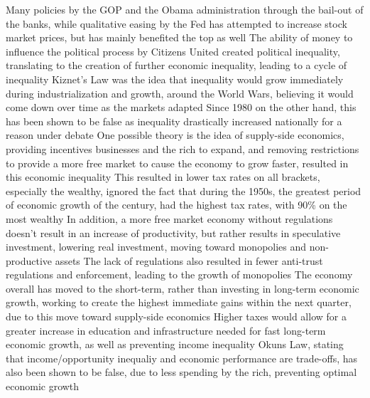 \documentclass[11 pt, twoside]{article}
\newenvironment{outline*}
{
	\begin{outline}[enumerate]
	}
	{\end{outline}
}
\begin{document}
\begin{outline*}
\2 Many policies by the GOP and the Obama administration through the bail-out of the banks, while qualitative easing by the Fed has attempted to increase stock market prices, but has mainly benefited the top as well
\2 The ability of money to influence the political process by Citizens United created political inequality, translating to the creation of further economic inequality, leading to a cycle of inequality
\1 Kiznet's Law was the idea that inequality would grow immediately during industrialization and growth, around the World Wars, believing it would come down over time as the markets adapted
\2 Since 1980 on the other hand, this has been shown to be false as inequality drastically increased nationally for a reason under debate
\2 One possible theory is the idea of supply-side economics, providing incentives businesses and the rich to expand, and removing restrictions to provide a more free market to cause the economy to grow faster, resulted in this economic inequality
\2 This resulted in lower tax rates on all brackets, especially the wealthy, ignored the fact that during the 1950s, the greatest period of economic growth of the century, had the highest tax rates, with 90\% on the most wealthy
\2 In addition, a more free market economy without regulations doesn't result in an increase of productivity, but rather results in speculative investment, lowering real investment, moving toward monopolies and non-productive assets
\2 The lack of regulations also resulted in fewer anti-trust regulations and enforcement, leading to the growth of monopolies
\1 The economy overall has moved to the short-term, rather than investing in long-term economic growth, working to create the highest immediate gains within the next quarter, due to this move toward supply-side economics
\2 Higher taxes would allow for a greater increase in education and infrastructure needed for fast long-term economic growth, as well as preventing income inequality
\1 Okuns Law, stating that income/opportunity inequaliy and economic performance are trade-offs, has also been shown to be false, due to less spending by the rich, preventing optimal economic growth
\end{outline*}
\end{document}
